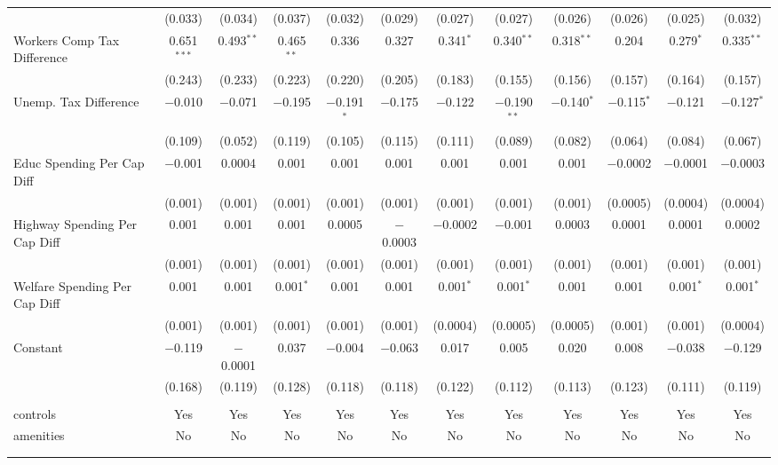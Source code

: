 \begin{table}[!htbp]
\begin{tabular}{@{\extracolsep{5pt}}lccccccccccc}
  & (0.033) & (0.034) & (0.037) & (0.032) & (0.029) & (0.027) & (0.027) & (0.026) & (0.026) & (0.025) & (0.032) \\ 
  Workers Comp Tax Difference & 0.651$^{***}$ & 0.493$^{**}$ & 0.465$^{**}$ & 0.336 & 0.327 & 0.341$^{*}$ & 0.340$^{**}$ & 0.318$^{**}$ & 0.204 & 0.279$^{*}$ & 0.335$^{**}$ \\ 
  & (0.243) & (0.233) & (0.223) & (0.220) & (0.205) & (0.183) & (0.155) & (0.156) & (0.157) & (0.164) & (0.157) \\ 
  Unemp. Tax Difference & $-$0.010 & $-$0.071 & $-$0.195 & $-$0.191$^{*}$ & $-$0.175 & $-$0.122 & $-$0.190$^{**}$ & $-$0.140$^{*}$ & $-$0.115$^{*}$ & $-$0.121 & $-$0.127$^{*}$ \\ 
  & (0.109) & (0.052) & (0.119) & (0.105) & (0.115) & (0.111) & (0.089) & (0.082) & (0.064) & (0.084) & (0.067) \\ 
  Educ Spending Per Cap Diff & $-$0.001 & 0.0004 & 0.001 & 0.001 & 0.001 & 0.001 & 0.001 & 0.001 & $-$0.0002 & $-$0.0001 & $-$0.0003 \\ 
  & (0.001) & (0.001) & (0.001) & (0.001) & (0.001) & (0.001) & (0.001) & (0.001) & (0.0005) & (0.0004) & (0.0004) \\ 
  Highway Spending Per Cap Diff & 0.001 & 0.001 & 0.001 & 0.0005 & $-$0.0003 & $-$0.0002 & $-$0.001 & 0.0003 & 0.0001 & 0.0001 & 0.0002 \\ 
  & (0.001) & (0.001) & (0.001) & (0.001) & (0.001) & (0.001) & (0.001) & (0.001) & (0.001) & (0.001) & (0.001) \\ 
  Welfare Spending Per Cap Diff & 0.001 & 0.001 & 0.001$^{*}$ & 0.001 & 0.001 & 0.001$^{*}$ & 0.001$^{*}$ & 0.001 & 0.001 & 0.001$^{*}$ & 0.001$^{*}$ \\ 
  & (0.001) & (0.001) & (0.001) & (0.001) & (0.001) & (0.0004) & (0.0005) & (0.0005) & (0.001) & (0.001) & (0.0004) \\ 
  Constant & $-$0.119 & $-$0.0001 & 0.037 & $-$0.004 & $-$0.063 & 0.017 & 0.005 & 0.020 & 0.008 & $-$0.038 & $-$0.129 \\ 
  & (0.168) & (0.119) & (0.128) & (0.118) & (0.118) & (0.122) & (0.112) & (0.113) & (0.123) & (0.111) & (0.119) \\ 
 \hline \\[-1.8ex] 
controls & Yes & Yes & Yes & Yes & Yes & Yes & Yes & Yes & Yes & Yes & Yes \\ 
amenities & No & No & No & No & No & No & No & No & No & No & No \\ 
\hline \\[-1.8ex] 
\hline 
\hline \\[-1.8ex] 
\end{tabular} 
\end{table} 
